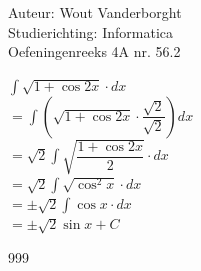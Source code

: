 \documentclass[a4paper]{article}
\newcommand{\Int}{\displaystyle\int}
\begin{document}
  
\noindent \large Auteur: Wout Vanderborght\\
\noindent \large Studierichting: Informatica\\
\noindent \large Oefeningenreeks 4A nr. 56.2\\

\medskip

\normalsize

$ \Int \sqrt{1+\cos 2x} \cdot dx $ \\

$ = \Int \left( \sqrt{1+\cos 2x} \cdot \dfrac{\sqrt{2}}{\sqrt{2}} \right) dx $ \\

$ = \sqrt{2} \Int \sqrt{\dfrac{1+\cos2x}{2}} \cdot dx $ \\

$ = \sqrt{2} \Int \sqrt{\cos^2 x} \cdot dx $ \\

$ = \pm \sqrt{2} \Int \cos x \cdot dx $ \\

$ = \pm \sqrt{2} \sin x + C $

\begin{thebibliography}{999}
\end{thebibliography}
\end{document}
